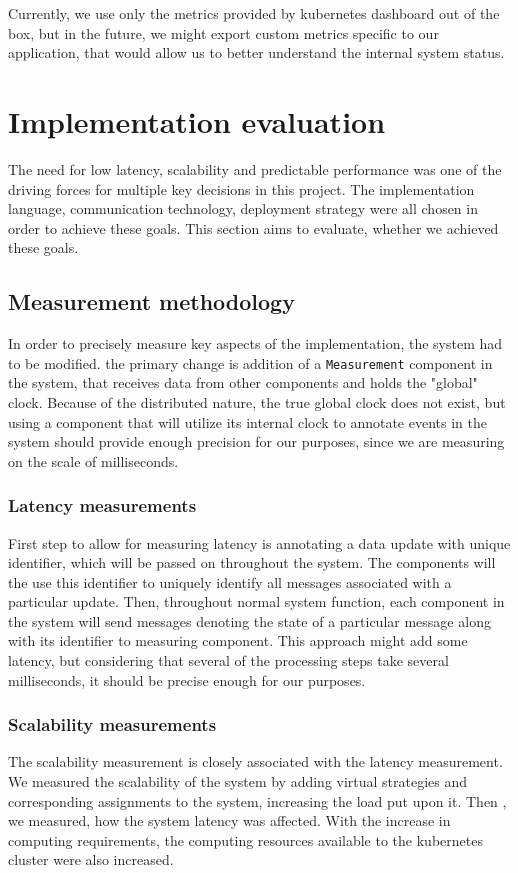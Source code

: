 Currently, we use only the metrics provided by kubernetes dashboard out of the box, but in the future, we might export
custom metrics specific to our application, that would allow us to better understand the internal system status.

\section{Implementation evaluation}
The need for low latency, scalability and predictable performance was one of the driving forces for multiple key decisions in this project.
The implementation language, communication technology, deployment strategy were all chosen in order to achieve these goals.
This section aims to evaluate, whether we achieved these goals.

\subsection{Measurement methodology}
In order to precisely measure key aspects of the implementation, the system had to be modified. the primary change
is addition of a \verb|Measurement| component in the system, that receives data from other components and holds the
"global" clock. Because of the distributed nature, the true global clock does not exist, but using a component that
will utilize its internal clock to annotate events in the system should provide enough precision for our purposes, since
we are measuring on the scale of milliseconds.

\subsubsection{Latency measurements}
First step to allow for measuring latency is annotating a data update with unique identifier, which will be passed on throughout the system.
The components will the use this identifier to uniquely identify all messages associated with a particular update.
Then, throughout normal system function, each component in the system will send messages denoting the state of a particular message along with its identifier
to measuring component. This approach might add some latency, but considering that several of the processing steps
take several milliseconds, it should be precise enough for our purposes.

\subsubsection{Scalability measurements}
The scalability measurement is closely associated with the latency measurement. We measured the scalability of the system
by adding virtual strategies and corresponding assignments to the system, increasing the load put upon it. Then , we measured,
how the system latency was affected. With the increase in computing requirements, the computing resources
available to the kubernetes cluster were also increased.

